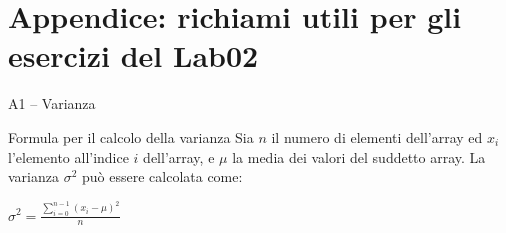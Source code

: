 \documentclass[presentation]{beamer}
\newcommand{\lab}{Lab02}
\begin{document}
\section{Appendice: richiami utili per gli esercizi del {\lab}}

\begin{frame}{A1 -- Varianza}

\begin{block}{Formula per il calcolo della varianza}
Sia $n$ il numero di elementi dell'array ed $x_i$ l'elemento all'indice $i$ dell'array, e $\mu$ la media dei valori del suddetto array. La varianza $\sigma^2$ può essere calcolata come:

\centering
\huge
$\sigma^2 = \frac{\displaystyle\sum_{i=0}^{n-1}(x_i - \mu)^2} {n}$
\end{block}
\end{frame}

%	
% 
\end{document}

